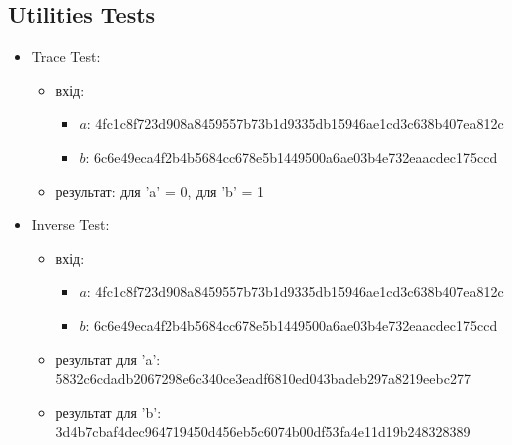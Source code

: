 \documentclass{article}
\begin{document}
\subsection{Utilities Tests}
\begin{itemize}
    \item Trace Test:
        \begin{itemize}
            \item вхід: 
                \begin{itemize}
                    \item $a$: 4fc1c8f723d908a8459557b73b1d9335db15946ae1cd3c638b407ea812c
                    \item $b$: 6c6e49eca4f2b4b5684cc678e5b1449500a6ae03b4e732eaacdec175ccd
                \end{itemize}
            \item  результат: для 'a' = 0, для 'b' = 1
        \end{itemize}
    \item Inverse Test:
        \begin{itemize}
            \item вхід: 
                \begin{itemize}
                    \item $a$: 4fc1c8f723d908a8459557b73b1d9335db15946ae1cd3c638b407ea812c
                    \item $b$: 6c6e49eca4f2b4b5684cc678e5b1449500a6ae03b4e732eaacdec175ccd
                \end{itemize}
            \item результат для 'a': 5832c6cdadb2067298e6c340ce3eadf6810ed043badeb297a8219eebc277
            \item результат для 'b': 3d4b7cbaf4dec964719450d456eb5c6074b00df53fa4e11d19b248328389
        \end{itemize}
\end{itemize}
\end{document}
